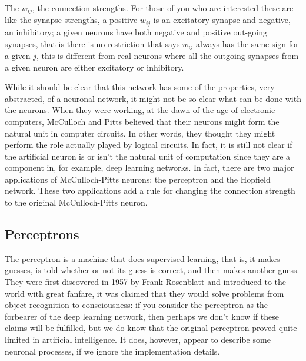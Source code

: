 \documentclass[12pt]{article}
\begin{document}
The $w_{ij}$, the connection strengths. For those of you who are
interested these are like the synapse strengths, a positive $w_{ij}$
is an excitatory synapse and negative, an inhibitory; a given neurons
have both negative and positive out-going synapses, that is there is
no restriction that says $w_{ij}$ always has the same sign for a given
$j$, this is different from real neurons where all the outgoing
synapses from a given neuron are either excitatory or inhibitory.

While it should be clear that this network has some of the properties,
very abstracted, of a neuronal network, it might not be so clear what
can be done with the neurons. When they were working, at the dawn of
the age of electronic computers, McCulloch and Pitts believed that
their neurons might form the natural unit in computer circuits. In
other words, they thought they might perform the role actually played
by logical circuits. In fact, it is still not clear if the artificial
neuron is or isn't the natural unit of computation since they are a
component in, for example, deep learning networks. In fact, there are
two major applications of McCulloch-Pitts neurons: the perceptron and
the Hopfield network. These two applications add a rule for changing
the connection strength to the original McCulloch-Pitts neuron.


\subsection*{Perceptrons}

The perceptron is a machine that does supervised learning, that is, it
makes guesses, is told whether or not its guess is correct, and then
makes another guess. They were first discovered in 1957 by Frank
Rosenblatt \cite{Rosenblatt1958} and introduced to the world with great fanfare, it was
claimed that they would solve problems from object recognition to
consciousness: if you consider the perceptron as the forbearer of the
deep learning network, then perhaps we don't know if these claims will
be fulfilled, but we do know that the original perceptron proved quite
limited in artificial intelligence. It does, however, appear to
describe some neuronal processes, if we ignore the implementation
details.
\end{document}
